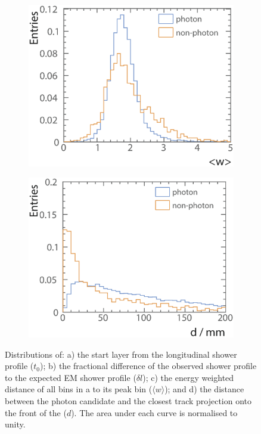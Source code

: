 \begin{figure}[tbph]
\begin{subfigure}[b]{0.45\textwidth}
    \includegraphics[width=\textwidth]{photon/likelihood/PeakRms2}
    \caption{}
    \label{fig:photonPeakRms}
  \end{subfigure}
  \begin{subfigure}[b]{0.45\textwidth}
    \includegraphics[width=\textwidth]{photon/likelihood/MinDistanceToTrack2}
    \caption{}
    \label{fig:photonMinDistanceToTrack}
  \end{subfigure}
\caption
{Distributions of: a) the start layer from the longitudinal shower profile ($t_0$); b)  the fractional difference of the observed shower profile to the expected EM shower profile ($\delta{l}$); c) the energy weighted \rms distance of all bins in a \ShowerPeak to its peak bin ($\langle{w}\rangle$); and d) the distance between the photon candidate and the closest track projection onto the front of the \ECAL ($d$). The area under each curve is normalised to unity.}
\label{fig:photonVarLikelihood}
\end{figure}



